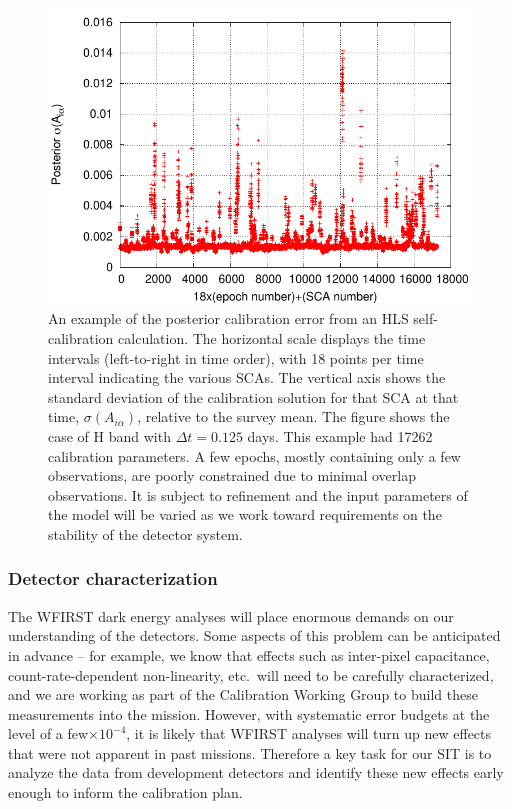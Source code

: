 \begin{figure}
\includegraphics[width=4.5in]{Plots/hcalfig.pdf}
\caption{\label{fig:hcalfig}An example of the posterior calibration error from an HLS self-calibration calculation. The horizontal scale displays the time intervals (left-to-right in time order), with 18 points per time interval indicating the various SCAs. The vertical axis shows the standard deviation of the calibration solution for that SCA at that time, $\sigma(A_{i\alpha})$, relative to the survey mean. The figure shows the case of H band with $\Delta t = 0.125$ days. This example had 17262 calibration parameters. A few epochs, mostly containing only a few observations, are poorly constrained due to minimal overlap observations. It is subject to refinement and the input parameters of the model will be varied as we work toward requirements on the stability of the detector system.}
\end{figure}

\subsubsection{Detector characterization}

The WFIRST dark energy analyses will place enormous demands on our understanding of the detectors. Some aspects of this problem can be anticipated in advance -- for example, we know that effects such as inter-pixel capacitance, count-rate-dependent non-linearity, etc.\ will need to be carefully characterized, and we are working as part of the Calibration Working Group to build these measurements into the mission. However, with systematic error budgets at the level of a few$\times 10^{-4}$, it is likely that WFIRST analyses will turn up new effects that were not apparent in past missions. Therefore a key task for our SIT is to analyze the data from development detectors and identify these new effects early enough to inform the calibration plan.

